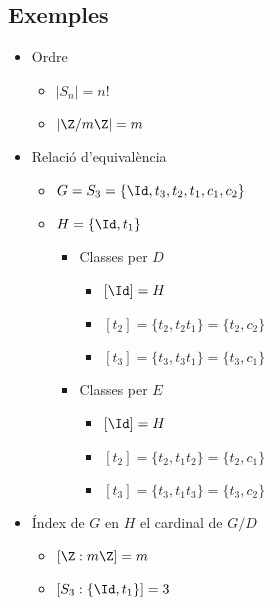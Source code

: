 \subsection*{Exemples}
\begin{itemize}
\item Ordre
	\begin{itemize}
	\item $|S_n| = n!$
	\item $|\Z/m\Z| = m$
	\end{itemize}
\item Relació d'equivalència
	\begin{itemize}
	\item $G = S_3 = \{\Id, t_3, t_2, t_1, c_1, c_2\}$
	\item $H = \{\Id, t_1\}$
		\begin{itemize}
		\item Classes per $D$
			\begin{itemize}
			\item $[\Id] = H$
			\item $[t_2] = \{t_2, t_2t_1\} = \{t_2, c_2\}$
			\item $[t_3] = \{t_3, t_3t_1\} = \{t_3, c_1\}$
			\end{itemize}
		\item Classes per $E$
			\begin{itemize}
			\item $[\Id] = H$
			\item $[t_2] = \{t_2, t_1t_2\} = \{t_2, c_1\}$
			\item $[t_3] = \{t_3, t_1t_3\} = \{t_3, c_2\}$
			\end{itemize}
		\end{itemize}
	\end{itemize}
\item Índex de $G$ en $H$ el cardinal de $G/D$
	\begin{itemize}
	\item $[\Z:m\Z] = m$
	\item $[S_3: \{\Id, t_1\}] = 3$
	\end{itemize}
\end{itemize}
